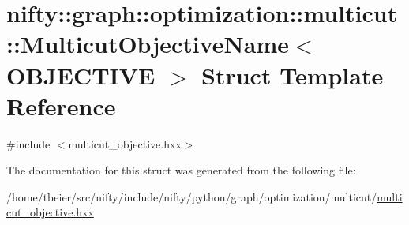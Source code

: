 \hypertarget{structnifty_1_1graph_1_1optimization_1_1multicut_1_1MulticutObjectiveName}{}\section{nifty\+:\+:graph\+:\+:optimization\+:\+:multicut\+:\+:Multicut\+Objective\+Name$<$ O\+B\+J\+E\+C\+T\+I\+V\+E $>$ Struct Template Reference}
\label{structnifty_1_1graph_1_1optimization_1_1multicut_1_1MulticutObjectiveName}


{\ttfamily \#include $<$multicut\+\_\+objective.\+hxx$>$}



The documentation for this struct was generated from the following file\+:\begin{DoxyCompactItemize}
\item 
/home/tbeier/src/nifty/include/nifty/python/graph/optimization/multicut/\hyperlink{python_2graph_2optimization_2multicut_2multicut__objective_8hxx}{multicut\+\_\+objective.\+hxx}\end{DoxyCompactItemize}
